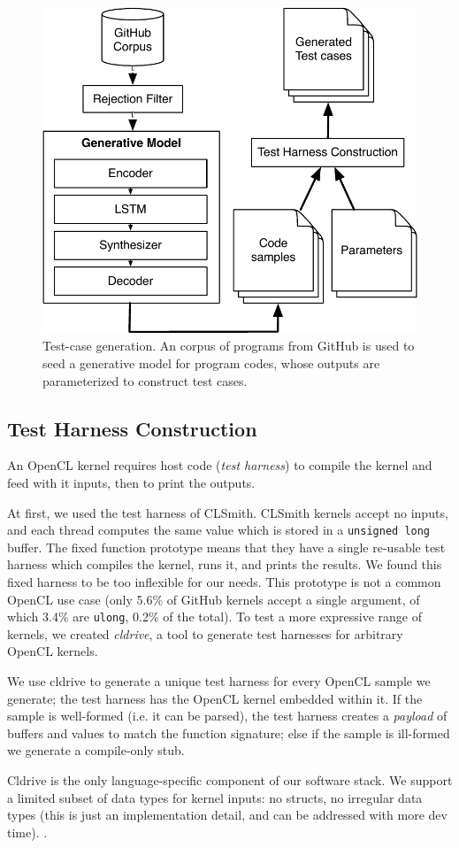 \begin{figure}
  \centering
  \includegraphics[width=.85\columnwidth]{img/clgen} %
  \caption{%
    Test-case generation. An corpus of programs from GitHub is used to seed a generative model for program codes, whose outputs are parameterized to construct test cases.%
  }%
  \label{fig:deeptune}
\end{figure}


\subsection{Test Harness Construction}

An OpenCL kernel requires host code (\emph{test harness}) to compile the kernel and feed with it inputs, then to print the outputs.

At first, we used the test harness of CLSmith. CLSmith kernels accept no inputs, and each thread computes the same value which is stored in a \texttt{unsigned long} buffer. The fixed function prototype means that they have a single re-usable test harness which compiles the kernel, runs it, and prints the results. We found this fixed harness to be too inflexible for our needs. This prototype is not a common OpenCL use case (only 5.6\% of GitHub kernels accept a single argument, of which 3.4\% are \texttt{ulong}, 0.2\% of the total).
To test a more expressive range of kernels, we created \emph{cldrive}, a tool to generate test harnesses for arbitrary OpenCL kernels.

We use cldrive to generate a unique test harness for every OpenCL sample we generate; the test harness has the OpenCL kernel embedded within it. If the sample is well-formed (i.e. it can be parsed), the test harness creates a \emph{payload} of buffers and values to match the function signature; else if the sample is ill-formed we generate a compile-only stub. 

Cldrive is the only language-specific component of our software stack. We support a limited subset of data types for kernel inputs: no structs, no irregular data types (this is just an implementation detail, and can be addressed with more dev time). .
